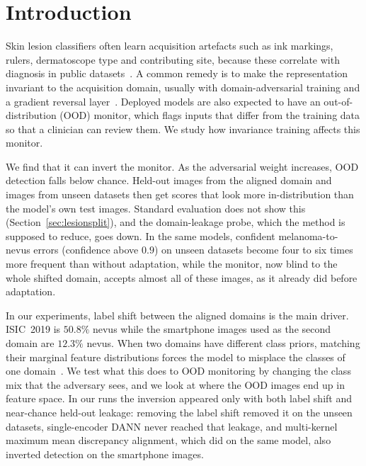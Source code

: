 \documentclass{midl}
\begin{document}
\section{Introduction}

Skin lesion classifiers often learn acquisition artefacts such as ink markings, rulers,
dermatoscope type and contributing site, because these correlate with diagnosis in public
datasets~\cite{winkler2019,bissoto2020,daneshjou2022}. A common remedy is to make the
representation invariant to the acquisition domain, usually with domain-adversarial
training and a gradient reversal layer~\cite{ganin2016,bousmalis2016}. Deployed models are
also expected to have an out-of-distribution (OOD) monitor, which flags inputs that differ
from the training data so that a clinician can review them. We study how invariance
training affects this monitor.

We find that it can invert the monitor. As the adversarial weight increases, OOD detection falls
below chance. Held-out images from the aligned domain and images from unseen datasets then get
scores that look more in-distribution than the model's own test images. Standard
evaluation does not show this (Section~\ref{sec:lesionsplit}), and the domain-leakage probe, which the method is
supposed to reduce, goes down. In the same models, confident melanoma-to-nevus errors (confidence above $0.9$) on unseen
datasets become four to six times more frequent than without adaptation, while the monitor,
now blind to the whole shifted domain, accepts almost all of these images, as it already did
before adaptation.

In our experiments, label shift between the aligned domains is the main driver. ISIC~2019 is $50.8\%$ nevus while the smartphone images used as the
second domain are $12.3\%$ nevus. When two domains have different class priors, matching
their marginal feature distributions forces the model to misplace the classes of one
domain~\cite{zhao2019invariant,tachet2020domain}. We test what this does to OOD monitoring by
changing the class mix that the adversary sees, and we look at where the OOD images
end up in feature space. In our runs the inversion appeared only with both label shift and
near-chance held-out leakage: removing the label shift removed it on the unseen datasets,
single-encoder DANN never reached that leakage, and multi-kernel maximum mean discrepancy alignment,
which did on the same model, also inverted detection on the smartphone images.
\end{document}
